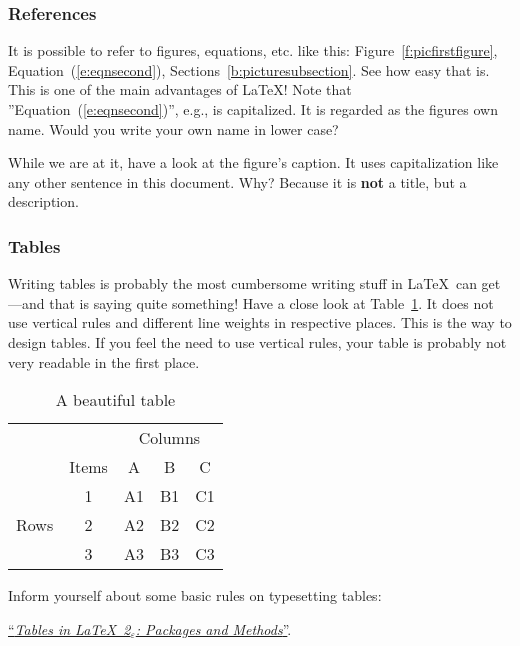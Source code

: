 \subsubsection{References}\label{b:subsecrefer}

It is possible to refer to figures, equations, etc. like this: Figure~\ref{f:picfirstfigure}, Equation~(\ref{e:eqnsecond}),
Sections~\ref{b:picturesubsection}. See how easy that is. This is one of the main advantages of \LaTeX!
Note that ''Equation~(\ref{e:eqnsecond})'', e.g., is capitalized. It is regarded as the figures own name. Would you
write your own name in lower case?

While we are at it, have a look at the figure's caption. It uses capitalization like any other sentence in this document.
Why? Because it is \textbf{not} a title, but a description.

\subsubsection{Tables}

Writing tables is probably the most cumbersome writing stuff in \LaTeX\ can get---and that is saying quite something!
Have a close look at Table~\ref{t:table}. It does not use vertical rules and different line weights in respective places.
This is the way to design tables. If you feel the need to use vertical rules, your table is probably not very readable in
the first place.

\begin{table}
	\caption{A beautiful table}
	\label{t:table}
	\begin{center}
	\begin{tabular}{ccccc}
	\toprule
                          	&        & \multicolumn{3}{c}{Columns} \\
    \cmidrule{3-5}
                            & Items  & A     & B     & C           \\
    \midrule
	\multirow{3}{*}{Rows}   & 1      & A1    & B1    & C1          \\
	                        & 2      & A2    & B2    & C2          \\
	                        & 3      & A3    & B3    & C3          \\
	\bottomrule
	\end{tabular}
	\end{center}
\end{table}

Inform yourself about some basic rules on typesetting tables:

\href{http://tug.org/pracjourn/2007-1/mori/mori.pdf}{``\textit{Tables in \LaTeX\ 2${}_\varepsilon$: Packages and Methods}''}.
